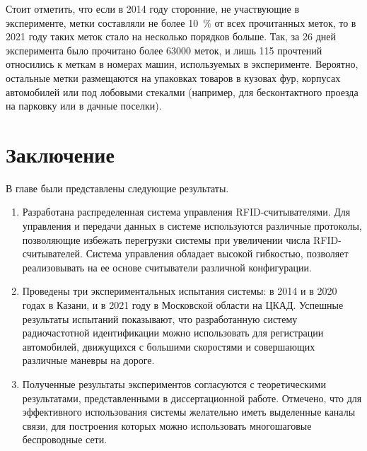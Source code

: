Стоит отметить, что если в 2014 году сторонние, не участвующие в эксперименте, метки составляли не более 10~\% от всех прочитанных меток, то в 2021 году таких меток стало на несколько порядков больше. Так, за 26 дней эксперимента было прочитано более 63000 меток, и лишь 115 прочтений относились к меткам в номерах машин, используемых в эксперименте. Вероятно, остальные метки размещаются на упаковках товаров в кузовах фур, корпусах автомобилей или под лобовыми стекалми (например, для бесконтактного проезда на парковку или в дачные поселки).



\section{Заключение}\label{sec:ch5_conclusion}

В главе были представлены следующие результаты.

\begin{enumerate}
  \item Разработана распределенная система управления RFID-считывателями. Для управления и передачи данных в системе используются различные протоколы, позволяющие избежать перегрузки системы при увеличении числа RFID-считывателей. Система управления обладает высокой гибкостью, позволяет реализовывать на ее основе считыватели различной конфигурации.
  \item Проведены три экспериментальных испытания системы: в 2014 и в 2020 годах в Казани, и в 2021 году в Московской области на ЦКАД. Успешные результаты испытаний показывают, что разработанную систему радиочастотной идентификации можно использовать для регистрации автомобилей, движущихся с большими скоростями и совершающих различные маневры на дороге.
  \item Полученные результаты экспериментов согласуются с теоретическими результатами, представленными в диссертационной работе. Отмечено, что для эффективного использования системы желательно иметь выделенные каналы связи, для построения которых можно использовать многошаговые беспроводные сети.
\end{enumerate}


\clearpage
